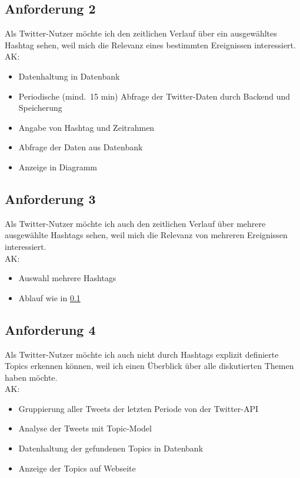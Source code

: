 \documentclass[conference]{IEEEtran}
\begin{document}
\subsection{Anforderung 2}
\label{2}
Als Twitter-Nutzer möchte ich den zeitlichen Verlauf über ein ausgewähltes Hashtag sehen,
weil mich die Relevanz eines bestimmten Ereignissen interessiert.
\\
AK:
\begin{itemize}
        \item Datenhaltung in Datenbank
        \item Periodische (mind.\ 15 min) Abfrage der Twitter-Daten durch Backend und Speicherung
        \item Angabe von Hashtag und Zeitrahmen
        \item Abfrage der Daten aus Datenbank
        \item Anzeige in Diagramm
\end{itemize}

\subsection{Anforderung 3}
Als Twitter-Nutzer möchte ich auch den zeitlichen Verlauf über mehrere ausgewählte Hashtags sehen,
weil mich die Relevanz von mehreren Ereignissen interessiert.
\\
AK:
\begin{itemize}
        \item Auswahl mehrere Hashtags
        \item Ablauf wie in \ref*{2}
\end{itemize}

\subsection{Anforderung 4}
Als Twitter-Nutzer möchte ich auch nicht durch Hashtags explizit definierte Topics erkennen können,
weil ich einen Überblick über alle diskutierten Themen haben möchte.
\\
AK:
\begin{itemize}
        \item Gruppierung aller Tweets der letzten Periode von der Twitter-API
        \item Analyse der Tweets mit Topic-Model
        \item Datenhaltung der gefundenen Topics in Datenbank
        \item Anzeige der Topics auf Webseite
\end{itemize}
\end{document}
